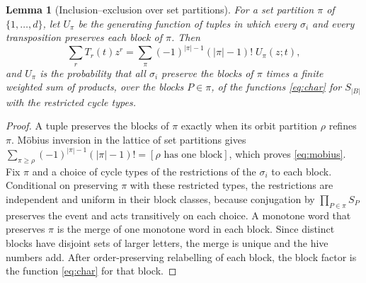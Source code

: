 \documentclass[11pt,a4paper]{article}
\newtheorem{lemma}[theorem]{Lemma}
\theoremstyle{definition}\newtheorem{definition}[theorem]{Definition}
\theoremstyle{remark}\newtheorem{remark}[theorem]{Remark}\newtheorem{example}[theorem]{Example}
\numberwithin{equation}{section}
\begin{document}
\begin{lemma}[Inclusion--exclusion over set partitions]\label{lem:mobius}
For a set partition $\pi$ of $\{1,\dots,d\}$, let $U_\pi$ be the generating function of tuples in which every $\sigma_i$ and every transposition preserves each block of $\pi$. Then
\begin{equation}\label{eq:mobius}
 \sum_rT_r(t)z^r=\sum_{\pi}(-1)^{|\pi|-1}(|\pi|-1)!\;U_\pi(z;t),
\end{equation}
and $U_\pi$ is the probability that all $\sigma_i$ preserve the blocks of $\pi$ times a finite weighted sum of products, over the blocks $P\in\pi$, of the functions \eqref{eq:char} for $S_{|B|}$ with the restricted cycle types.
\end{lemma}
\begin{proof}
A tuple preserves the blocks of $\pi$ exactly when its orbit partition $\rho$ refines $\pi$. Möbius inversion in the lattice of set partitions gives $\sum_{\pi\ge\rho}(-1)^{|\pi|-1}(|\pi|-1)!=[\rho\text{ has one block}]$, which proves \eqref{eq:mobius}. Fix $\pi$ and a choice of cycle types of the restrictions of the $\sigma_i$ to each block. Conditional on preserving $\pi$ with these restricted types, the restrictions are independent and uniform in their block classes, because conjugation by $\prod_{P\in\pi}S_P$ preserves the event and acts transitively on each choice. A monotone word that preserves $\pi$ is the merge of one monotone word in each block. Since distinct blocks have disjoint sets of larger letters, the merge is unique and the hive numbers add. After order-preserving relabelling of each block, the block factor is the function \eqref{eq:char} for that block.
\end{proof}
\end{document}
